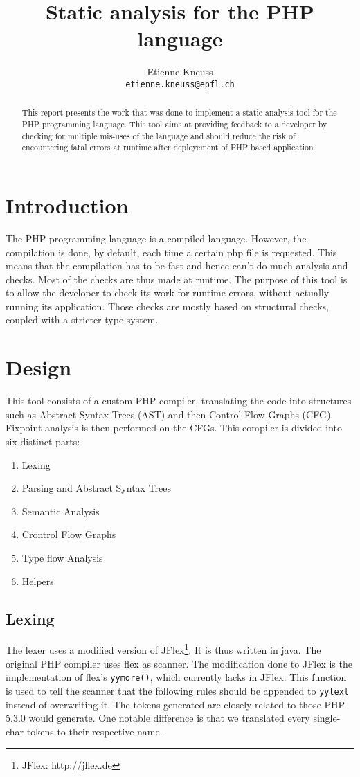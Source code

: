 \documentclass[a4paper]{article}
\author{Etienne Kneuss\\
\texttt{etienne.kneuss@epfl.ch}
}
\title{Static analysis for the PHP language}
\begin{document}
\maketitle
\begin{abstract}
  This report presents the work that was done to implement a static analysis
  tool for the PHP programming language. This tool aims at providing feedback
  to a developer by checking for multiple mis-uses of the language and should
  reduce the risk of encountering fatal errors at runtime after deployement of
  PHP based application.
\end{abstract}
\section{Introduction}
The PHP programming language is a compiled language. However, the compilation is
done, by default, each time a certain php file is requested. This means that the
compilation has to be fast and hence can't do much analysis and checks. Most of
the checks are thus made at runtime. The purpose of this tool is to allow the
developer to check its work for runtime-errors, without actually running its
application. Those checks are mostly based on structural checks, coupled with
a stricter type-system.
\section{Design}
This tool consists of a custom PHP compiler, translating the code
into structures such as Abstract Syntax Trees (AST) and then Control Flow Graphs
(CFG). Fixpoint analysis is then performed on the CFGs. This compiler is
divided into six distinct parts:
\begin{enumerate}
  \item Lexing
  \item Parsing and Abstract Syntax Trees
  \item Semantic Analysis
  \item Crontrol Flow Graphs
  \item Type flow Analysis
  \item Helpers
\end{enumerate}

\subsection{Lexing}
The lexer uses a modified version of JFlex\footnote{JFlex: http://jflex.de}. It
is thus written in java. The original PHP compiler uses flex as scanner. The
modification done to JFlex is the implementation of flex's \verb=yymore()=,
which currently lacks in JFlex. This function is used to tell the scanner that
the following rules should be appended to \verb=yytext= instead of overwriting
it. The tokens generated are closely related to those PHP 5.3.0 would generate.
One notable difference is that we translated every single-char tokens to their
respective name.
\end{document}
